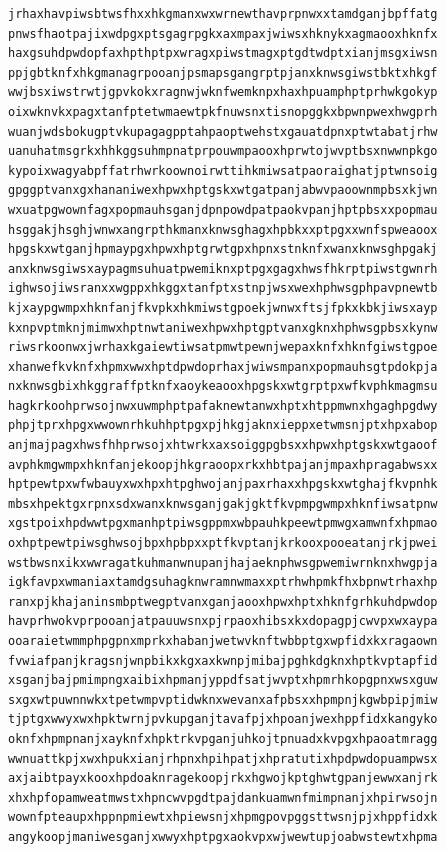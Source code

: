\documentclass[11pt,letterpaper]{exam}
\begin{document}
\begin{questions}
\begin{verbatim}
jrhaxhavpiwsbtwsfhxxhkgmanxwxwrnewthavprpnwxxtamdganjbpffatg
pnwsfhaotpajixwdpgxptsgagrpgkxaxmpaxjwiwsxhknykxagmaooxhknfx
haxgsuhdpwdopfaxhpthptpxwragxpiwstmagxptgdtwdptxianjmsgxiwsn
ppjgbtknfxhkgmanagrpooanjpsmapsgangrptpjanxknwsgiwstbktxhkgf
wwjbsxiwstrwtjgpvkokxragnwjwknfwemknpxhaxhpuamphptprhwkgokyp
oixwknvkxpagxtanfptetwmaewtpkfnuwsnxtisnopggkxbpwnpwexhwgprh
wuanjwdsbokugptvkupagagpptahpaoptwehstxgauatdpnxptwtabatjrhw
uanuhatmsgrkxhhkggsuhmpnatprpouwmpaooxhprwtojwvptbsxnwwnpkgo
kypoixwagyabpffatrhwrkoownoirwttihkmiwsatpaoraighatjptwnsoig
gpggptvanxgxhananiwexhpwxhptgskxwtgatpanjabwvpaoownmpbsxkjwn
wxuatpgwownfagxpopmauhsganjdpnpowdpatpaokvpanjhptpbsxxpopmau
hsggakjhsghjwnwxangrpthkmanxknwsghagxhpbkxxptpgxxwnfspweaoox
hpgskxwtganjhpmaypgxhpwxhptgrwtgpxhpnxstnknfxwanxknwsghpgakj
anxknwsgiwsxaypagmsuhuatpwemiknxptpgxgagxhwsfhkrptpiwstgwnrh
ighwsojiwsranxxwgppxhkggxtanfptxstnpjwsxwexhphwsgphpavpnewtb
kjxaypgwmpxhknfanjfkvpkxhkmiwstgpoekjwnwxftsjfpkxkbkjiwsxayp
kxnpvptmknjmimwxhptnwtaniwexhpwxhptgptvanxgknxhphwsgpbsxkynw
riwsrkoonwxjwrhaxkgaiewtiwsatpmwtpewnjwepaxknfxhknfgiwstgpoe
xhanwefkvknfxhpmxwwxhptdpwdoprhaxjwiwsmpanxpopmauhsgtpdokpja
nxknwsgbixhkggraffptknfxaoykeaooxhpgskxwtgrptpxwfkvphkmagmsu
hagkrkoohprwsojnwxuwmphptpafaknewtanwxhptxhtppmwnxhgaghpgdwy
phpjtprxhpgxwwownrhkuhhptpgxpjhkgjaknxieppxetwmsnjptxhpxabop
anjmajpagxhwsfhhprwsojxhtwrkxaxsoiggpgbsxxhpwxhptgskxwtgaoof
avphkmgwmpxhknfanjekoopjhkgraoopxrkxhbtpajanjmpaxhpragabwsxx
hptpewtpxwfwbauyxwxhpxhtpghwojanjpaxrhaxxhpgskxwtghajfkvpnhk
mbsxhpektgxrpnxsdxwanxknwsganjgakjgktfkvpmpgwmpxhknfiwsatpnw
xgstpoixhpdwwtpgxmanhptpiwsgppmxwbpauhkpeewtpmwgxamwnfxhpmao
oxhptpewtpiwsghwsojbpxhpbpxxptfkvptanjkrkooxpooeatanjrkjpwei
wstbwsnxikxwwragatkuhmanwnupanjhajaeknphwsgpwemiwrnknxhwgpja
igkfavpxwmaniaxtamdgsuhagknwramnwmaxxptrhwhpmkfhxbpnwtrhaxhp
ranxpjkhajaninsmbptwegptvanxganjaooxhpwxhptxhknfgrhkuhdpwdop
havprhwokvprpooanjatpauuwsnxpjrpaoxhibsxkxdopagpjcwvpxwxaypa
ooaraietwmmphpgpnxmprkxhabanjwetwvknftwbbptgxwpfidxkxragaown
fvwiafpanjkragsnjwnpbikxkgxaxkwnpjmibajpghkdgknxhptkvptapfid
xsganjbajpmimpngxaibixhpmanjyppdfsatjwvptxhpmrhkopgpnxwsxguw
sxgxwtpuwnnwkxtpetwmpvptidwknxwevanxafpbsxxhpmpnjkgwbpipjmiw
tjptgxwwyxwxhpktwrnjpvkupganjtavafpjxhpoanjwexhppfidxkangyko
oknfxhpmpnanjxayknfxhpktrkvpganjuhkojtpnuadxkvpgxhpaoatmragg
wwnuattkpjxwxhpukxianjrhpnxhpihpatjxhpratutixhpdpwdopuampwsx
axjaibtpayxkooxhpdoaknragekoopjrkxhgwojkptghwtgpanjewwxanjrk
xhxhpfopamweatmwstxhpncwvpgdtpajdankuamwnfmimpnanjxhpirwsojn
wownfpteaupxhppnpmiewtxhpiewsnjxhpmgpovpggsttwsnjpjxhppfidxk
angykoopjmaniwesganjxwwyxhptpgxaokvpxwjwewtupjoabwstewtxhpma

\end{verbatim}
\end{questions}
\end{document}
